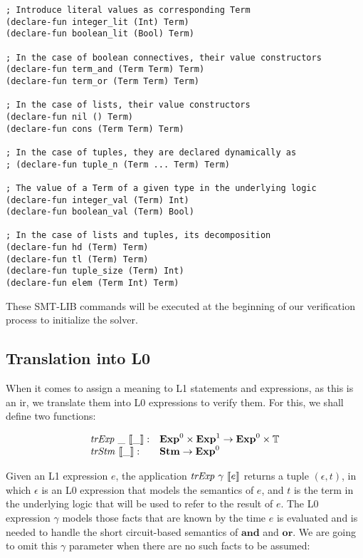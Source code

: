 \begin{verbatim}
; Introduce literal values as corresponding Term
(declare-fun integer_lit (Int) Term)
(declare-fun boolean_lit (Bool) Term)

; In the case of boolean connectives, their value constructors
(declare-fun term_and (Term Term) Term)
(declare-fun term_or (Term Term) Term)

; In the case of lists, their value constructors
(declare-fun nil () Term)
(declare-fun cons (Term Term) Term)

; In the case of tuples, they are declared dynamically as
; (declare-fun tuple_n (Term ... Term) Term)

; The value of a Term of a given type in the underlying logic
(declare-fun integer_val (Term) Int)
(declare-fun boolean_val (Term) Bool)

; In the case of lists and tuples, its decomposition
(declare-fun hd (Term) Term)
(declare-fun tl (Term) Term)
(declare-fun tuple_size (Term) Int)
(declare-fun elem (Term Int) Term)
\end{verbatim}

These SMT-LIB commands will be executed at the beginning of our verification
process to initialize the solver.

\subsection{Translation into L0}
\label{sec:translationL0}

When it comes to assign a meaning to L1 statements and expressions, as this is
an \gls{ir}, we translate them into L0 expressions to verify them. For this, we
shall define two functions:

\[
\begin{array}{ll}
\mathit{trExp}~\_~\llbracket\_\rrbracket : & \mathbf{Exp}^{0} \times \mathbf{Exp}^{1} \rightarrow \mathbf{Exp}^{0} \times \mathbb{T}\\
\mathit{trStm}~\llbracket\_\rrbracket : & \mathbf{Stm} \rightarrow \mathbf{Exp}^{0}
\end{array}
\]

Given an L1 expression $e$, the application $\mathit{trExp}~\gamma~\llbracket e\rrbracket$ returns a tuple 
$(\epsilon, t)$, in which $\epsilon$ is an L0 expression that models the
semantics of $e$, and $t$ is the term in the underlying logic that will be used
to refer to the result of $e$. The L0 expression $\gamma$ models those facts
that are known by the time $e$ is evaluated and is needed to handle the short
circuit-based semantics of $\mathbf{and}$ and $\mathbf{or}$. We are going to
omit this $\gamma$ parameter when there are no such facts to be assumed:

